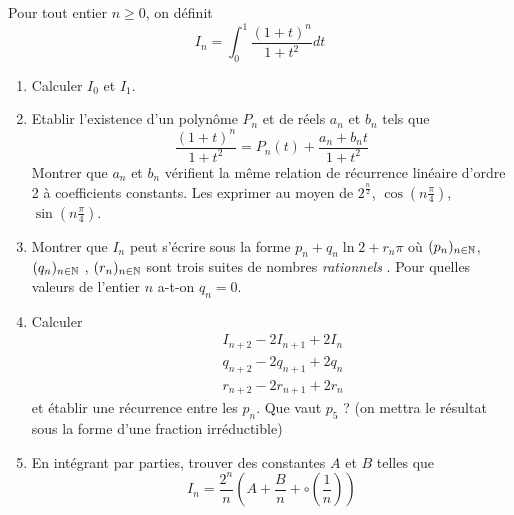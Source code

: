 Pour tout entier $n\geq 0$, on d{\'e}finit
\[
I_{n}=\int_{0}^{1}\frac{(1+t)^{n}}{1+t^{2}}dt
\]

\begin{enumerate}
\item  Calculer $I_{0}$ et $I_{1}$.

\item  Etablir l'existence d'un polyn{\^o}me $P_{n}$ et de r{\'e}els $a_{n}$
et $b_{n}$ tels que
\[
\frac{(1+t)^{n}}{1+t^{2}}=P_{n}(t)+\frac{a_{n}+b_{n}t}{1+t^{2}}
\]
Montrer que $a_{n}$ et $b_{n}$ v{\'e}rifient la m{\^e}me relation de
r{\'e}currence lin{\'e}aire d'ordre 2 {\`a} coefficients constants. Les
exprimer au moyen de $2^{\frac{n}{2}}$, $\cos (n\frac{\pi }{4})$, $\sin (n%
\frac{\pi }{4})$.

\item  Montrer que $I_{n}$ peut s'{\'e}crire sous la forme $p_{n}+q_{n}\ln
2+r_{n}\pi $ o{\`u} $(p_{n})_{n\in \mathbb{N}}$, $(q_{n})_{n\in \mathbb{N}}$%
, $(r_{n})_{n\in \mathbb{N}}$ sont trois suites de nombres \emph{rationnels}%
. Pour quelles valeurs de l'entier $n$ a-t-on $q_{n}=0$.

\item  Calculer
\begin{eqnarray*}
&&I_{n+2}-2I_{n+1}+2I_{n} \\
&&q_{n+2}-2q_{n+1}+2q_{n} \\
&&r_{n+2}-2r_{n+1}+2r_{n}
\end{eqnarray*}
et {\'e}tablir une r{\'e}currence entre les $p_{n}$. Que vaut $p_{5}$ ? (on
mettra le r{\'e}sultat sous la forme d'une fraction irr{\'e}ductible)

\item  En int{\'e}grant par parties, trouver des constantes $A$ et $B$
telles que
\[
I_{n}=\frac{2^{n}}{n}(A+\frac{B}{n}+\circ (\frac{1}{n}))
\]
\end{enumerate}
